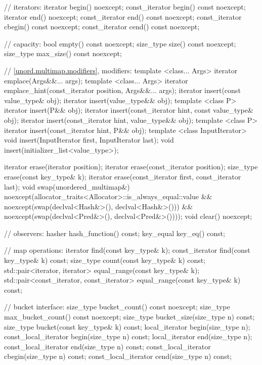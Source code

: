 \begin{codeblock}
{{    // iterators:
    iterator       begin() noexcept;
    const_iterator begin() const noexcept;
    iterator       end() noexcept;
    const_iterator end() const noexcept;
    const_iterator cbegin() const noexcept;
    const_iterator cend() const noexcept;

    // capacity:
    bool      empty() const noexcept;
    size_type size() const noexcept;
    size_type max_size() const noexcept;

    // \ref{unord.multimap.modifiers}, modifiers:
    template <class... Args> iterator emplace(Args&&... args);
    template <class... Args> iterator emplace_hint(const_iterator position, Args&&... args);
    iterator insert(const value_type& obj);
    iterator insert(value_type&& obj);
    template <class P> iterator insert(P&& obj);
    iterator insert(const_iterator hint, const value_type& obj);
    iterator insert(const_iterator hint, value_type&& obj);
    template <class P> iterator insert(const_iterator hint, P&& obj);
    template <class InputIterator> void insert(InputIterator first, InputIterator last);
    void insert(initializer_list<value_type>);

    iterator  erase(iterator position);
    iterator  erase(const_iterator position);
    size_type erase(const key_type& k);
    iterator  erase(const_iterator first, const_iterator last);
    void      swap(unordered_multimap&)
      noexcept(allocator_traits<Allocator>::is_always_equal::value &&
               noexcept(swap(declval<Hash&>(), declval<Hash&>())) &&
               noexcept(swap(declval<Pred&>(), declval<Pred&>())));
    void      clear() noexcept;

    // observers:
    hasher hash_function() const;
    key_equal key_eq() const;

    // map operations:
    iterator       find(const key_type& k);
    const_iterator find(const key_type& k) const;
    size_type      count(const key_type& k) const;
    std::pair<iterator, iterator>             equal_range(const key_type& k);
    std::pair<const_iterator, const_iterator> equal_range(const key_type& k) const;

    // bucket interface:
    size_type bucket_count() const noexcept;
    size_type max_bucket_count() const noexcept;
    size_type bucket_size(size_type n) const;
    size_type bucket(const key_type& k) const;
    local_iterator begin(size_type n);
    const_local_iterator begin(size_type n) const;
    local_iterator end(size_type n);
    const_local_iterator end(size_type n) const;
    const_local_iterator cbegin(size_type n) const;
    const_local_iterator cend(size_type n) const;

}}
\end{codeblock}
